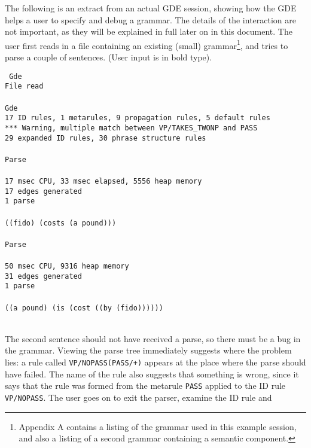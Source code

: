 The following is an extract from an actual GDE session, showing how the GDE
helps a user to specify and debug a grammar. The details of the interaction
are not important, as they will be explained in full later on in this
document.  The user first reads in a file containing an existing (small)
grammar\footnote{Appendix A contains a listing of the grammar used in
this example session, and also a listing of a second grammar containing
a semantic component.},
and tries to parse a couple of sentences. (User input is in bold type).
\begin{display}
{\small\tt
Gde\\
File read\\
\\
Gde\\
17 ID rules, 1 metarules, 9 propagation rules, 5 default rules\\
*** Warning, multiple match between VP/TAKES\_TWONP and PASS\\
29 expanded ID rules, 30 phrase structure rules\\
\\
Parse\ran{}\\
\\
17 msec CPU, 33 msec elapsed, 5556 heap memory\\
17 edges generated\\
1 parse\\
\\
((fido) (costs (a pound)))\\
\\
Parse\ran{}\\
\\
50 msec CPU, 9316 heap memory\\
31 edges generated\\
1 parse\\
\\
((a pound) (is (cost ((by (fido))))))\\
\\
} \end{display}
The second sentence should not have received a parse, so there must be a bug
in the grammar. Viewing the parse tree immediately suggests where the
problem lies: a rule called {\tt VP/NOPASS(PASS/+)}
appears at the place where the parse should have failed. The name of the
rule also suggests that something is wrong, since it says that the rule was
formed from the metarule {\tt PASS} applied to the ID rule
{\tt VP/NOPASS}. The user goes on to exit the parser, examine the ID rule and
